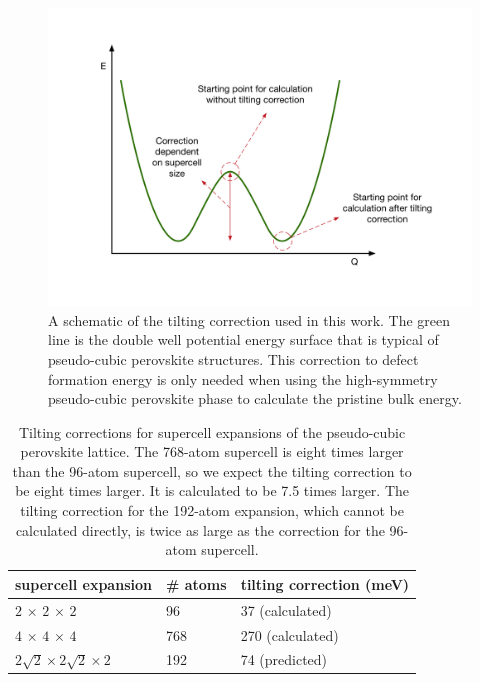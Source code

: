 \begin{figure}[h!]   
\centering
  \includegraphics[width=0.9\columnwidth]{figures/ch6/tilting_correction.png}
  \caption[Tilting correction for the pseudo-cubic perovskite lattice]{A schematic of the tilting correction used in this work. The green line is the double well potential energy surface that is typical of pseudo-cubic perovskite structures. This correction to defect formation energy is only needed when using the high-symmetry pseudo-cubic perovskite phase to calculate the pristine bulk energy.}
\label{tilting_correction}
\end{figure}

\begin{table}[h!]\centering
\begin{tabular}{lll}\toprule
supercell expansion&\# atoms&tilting correction (meV) \\ 
\midrule
$2\,\times\,2\,\times\,2$ & 96 & 37 (calculated) \\
$4\,\times\,4\,\times\,4$ & 768 & 270 (calculated) \\
$2\sqrt2\times2\sqrt2\times2$ & 192 & 74 (predicted) \\
\bottomrule
\end{tabular} 
\caption[Tilting corrections for supercell expansions of the pseudo-cubic perovskite lattice]{\label{modemaptable} Tilting corrections for supercell expansions of the pseudo-cubic perovskite lattice. The 768-atom supercell is eight times larger than the 96-atom supercell, so we expect the tilting correction to be eight times larger. It is calculated to be 7.5 times larger. The tilting correction for the 192-atom expansion, which cannot be calculated directly, is twice as large as the correction for the 96-atom supercell. }
\end{table}

